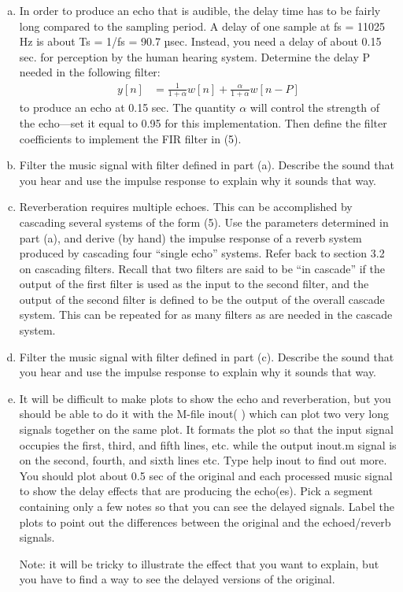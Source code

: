 \begin{enumerate}[a)]
\item In order to produce an echo that is audible, the delay time has to be fairly long compared to the sampling period. A delay of one sample at fs = 11025 Hz is about Ts = 1/fs = 90.7 µsec. 
	Instead, you need a delay of about 0.15 sec. for perception by the human hearing system. Determine the delay
	P needed in the following filter:
	\begin{align}
		y[n] &= \frac{1}{1+\alpha} w[n] + \frac{\alpha}{1+\alpha} w[n-P]
	\end{align}
	to produce an echo at 0.15 sec. The quantity $\alpha$ will control the strength of the echo—set it equal to
	0.95 for this implementation. Then define the filter coefficients to implement the FIR filter in (5).
	
\item Filter the music signal with filter defined in part (a). Describe the sound that you hear and use the impulse response to explain why it sounds that way.

\item Reverberation requires multiple echoes. 
	This can be accomplished by cascading several systems of the form (5). Use the parameters determined in part (a), and derive (by hand) the impulse response of a reverb system produced by cascading four “single echo” systems. Refer back to section 3.2 on cascading filters. Recall that two filters are said to be “in cascade” if the output of the first filter is used as the input to the second filter, and the output of the second filter is defined to be the output of the overall cascade system. This can be repeated for as many filters as are needed in the cascade system.
	
\item Filter the music signal with filter defined in part (c). 
	Describe the sound that you hear and use the impulse response to explain why it sounds that way.
	
\item It will be difficult to make plots to show the echo and reverberation, but you should be able to do it with the M-file inout( ) which can plot two very long signals together on the same plot. 
	It formats the plot so that the input signal occupies the first, third, and fifth lines, etc. while the output inout.m signal is on the second, fourth, and sixth lines etc. Type help inout to find out more.
	You should plot about 0.5 sec of the original and each processed music signal to show the delay effects that are producing the echo(es). Pick a segment containing only a few notes so that you can see the delayed signals. Label the plots to point out the differences between the original and the echoed/reverb signals. 
	
	Note: it will be tricky to illustrate the effect that you want to explain, but you have to find a way to see the delayed versions of the original.
\end{enumerate}





